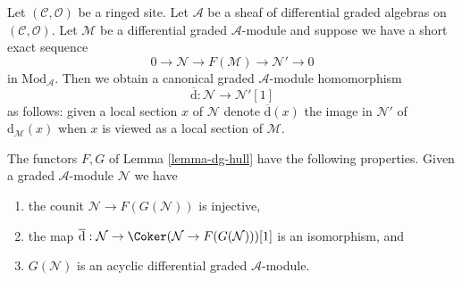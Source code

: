 \noindent
Let $(\mathcal{C}, \mathcal{O})$ be a ringed site.
Let $\mathcal{A}$ be a sheaf of differential graded algebras
on $(\mathcal{C}, \mathcal{O})$. Let $\mathcal{M}$ be a differential
graded $\mathcal{A}$-module and suppose we have a short exact sequence
$$
0 \to \mathcal{N} \to F(\mathcal{M}) \to \mathcal{N}' \to 0
$$
in $\text{Mod}_\mathcal{A}$. Then we obtain a canonical
graded $\mathcal{A}$-module homomorphism
$$
\overline{\text{d}} : \mathcal{N} \to \mathcal{N}'[1]
$$
as follows: given a local section $x$ of $\mathcal{N}$ denote
$\overline{\text{d}}(x)$ the image in $\mathcal{N}'$ of
$\text{d}_\mathcal{M}(x)$ when $x$ is viewed as a local section
of $\mathcal{M}$.

\begin{lemma}
\label{lemma-dg-hull-acyclic}
The functors $F, G$ of Lemma \ref{lemma-dg-hull} have
the following properties. Given a graded $\mathcal{A}$-module
$\mathcal{N}$ we have
\begin{enumerate}
\item the counit $\mathcal{N} \to F(G(\mathcal{N}))$ is injective,
\item the map $\overline{\text{d}} : \mathcal{N} \to
\Coker(\mathcal{N} \to F(G(\mathcal{N})))[1]$ is an isomorphism, and
\item $G(\mathcal{N})$ is an acyclic differential graded $\mathcal{A}$-module.
\end{enumerate}
\end{lemma}

